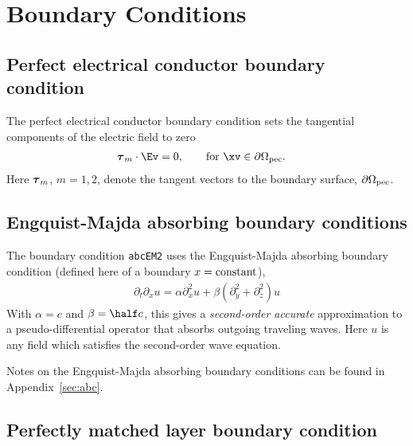 \documentclass{article}
\begin{document}
\clearpage
\section{Boundary Conditions} \label{sec:bc}

\subsection{Perfect electrical conductor boundary condition}\label{sec:perfectElectricalConductor}

The perfect electrical conductor boundary condition sets the tangential components of the
electric field to zero
\begin{align}
   \tauv_m\cdot\Ev &= 0, \qquad \text{for $\xv \in \partial\Omega_{\rm pec}$}. 
\end{align}
Here $\boldsymbol{\tau}_m$, $m=1,2$, denote the tangent vectors to the boundary surface, $\partial\Omega_{\rm pec}$.

\subsection{Engquist-Majda absorbing boundary conditions}\label{sec:EngquistMajdaABC}


The boundary condition {\tt abcEM2} uses the Engquist-Majda absorbing boundary 
condition (defined here of a boundary $x={\rm constant}$), 
\begin{align}
   \partial_t\partial_x u = \alpha \partial_x^2 u + \beta (\partial_y^2+\partial_z^2) u 
\end{align}
With $\alpha=c$ and $\beta=\half c$, this gives a {\em second-order accurate} approximation to 
a pseudo-differential operator that absorbs outgoing traveling waves. 
Here $u$ is any field which satisfies the second-order wave equation.

Notes on the Engquist-Majda absorbing boundary conditions can be found in Appendix~\ref{sec:abc}.


\subsection{Perfectly matched layer boundary condition}\label{sec:PML}
\end{document}
